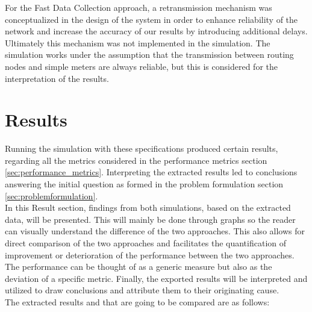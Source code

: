 
For the Fast Data Collection approach, a retransmission mechanism was conceptualized in the design of the system in order to enhance reliability of the network and increase the accuracy of our results by introducing additional delays. Ultimately this mechanism was not implemented in the simulation. The simulation works under the assumption that the transmission between routing nodes and simple meters are always reliable, but this is considered for the interpretation of the results.

\section{Results}
Running the simulation with these specifications produced certain results, regarding all the metrics considered in the performance metrics section \ref{sec:performance_metrics}. Interpreting the extracted results led to conclusions answering the initial question as formed in the problem formulation section \ref{sec:problemformulation}.\\
In this Result section, findings from both simulations, based on the extracted data, will be presented. This will mainly be done through graphs so the reader can visually understand the difference of the two approaches. This also allows for direct comparison of the two approaches and facilitates the quantification of improvement or deterioration of the performance between the two approaches. The performance can be thought of as a generic measure but also as the deviation of a specific metric. Finally, the exported results will be interpreted and utilized to draw conclusions and attribute them to their originating cause.\\
The extracted results and that are going to be compared are as follows:


